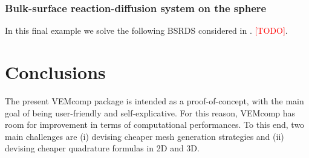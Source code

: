 \documentclass[a4paper]{article}
\newcommand{\red}[1]{\textcolor{red}{#1}}
\begin{document}
\subsubsection{Bulk-surface reaction-diffusion system on the sphere}
\label{sec:example_bsrds_sphere}
In this final example we solve the following BSRDS considered in \cite{frittelli2023bsrds}. \red{[TODO]}.


\section{Conclusions}
\label{sec:conclusions}
The present VEMcomp package is intended as a proof-of-concept,  with the main goal of being user-friendly and self-explicative. For this reason,  VEMcomp has room for improvement in terms of computational performances.  To this end,  two main challenges are (i) devising cheaper mesh generation strategies and (ii) devising cheaper quadrature formulas in 2D and 3D.
 


 
\end{document}
